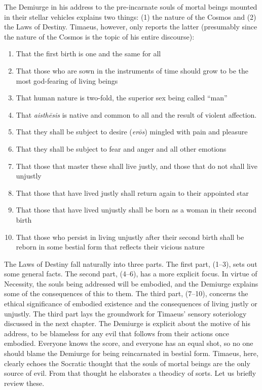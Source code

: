 The Demiurge in his address to the pre-incarnate souls of mortal beings mounted in their stellar vehicles explains two things: (1) the nature of the Cosmos and (2) the Laws of Destiny. Timaeus, however, only reports the latter (presumably since the nature of the Cosmos is the topic of his entire discourse):
\begin{enumerate}[(1)]
	\item That the first birth is one and the same for all
	\item That those who are sown in the instruments of time should grow to be the most god-fearing of living beings
	\item That human nature is two-fold, the superior sex being called ``man''
	\item That \emph{aisthēsis} is native and common to all and the result of violent affection.
	\item That they shall be subject to desire (\emph{erōs}) mingled with pain and pleasure
	\item That they shall be subject to fear and anger and all other emotions
	\item That those that master these shall live justly, and those that do not shall live unjustly
	\item That those that have lived justly shall return again to their appointed star
	\item That those that have lived unjustly shall be born as a woman in their second birth
	\item That those who persist in living unjustly after their second birth shall be reborn in some bestial form that reflects their vicious nature
\end{enumerate}
The Laws of Destiny fall naturally into three parts. The first part, (1--3), sets out some general facts. The second part, (4--6), has a more explicit focus. In virtue of Necessity, the souls being addressed will be embodied, and the Demiurge explains some of the consequences of this to them. The third part, (7--10), concerns the ethical significance of embodied existence and the consequences of living justly or unjustly. The third part lays the groundwork for Timaeus' sensory soteriology discussed in the next chapter. The Demiurge is explicit about the motive of his address, to be blameless for any evil that follows from their actions once embodied. Everyone knows the score, and everyone has an equal shot, so no one should blame the Demiurge for being reincarnated in bestial form. Timaeus, here, clearly echoes the Socratic thought that the souls of mortal beings are the only source of evil. From that thought he elaborates a theodicy of sorts. Let us briefly review these.


